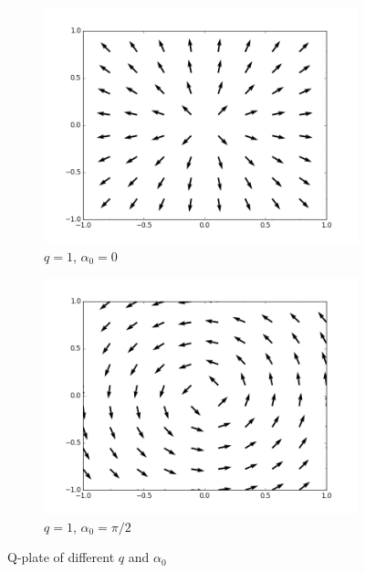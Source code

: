 \documentclass[11pt,a4paper]{article}
\numberwithin{equation}{section}
\begin{document}
\begin{figure}[H]
\begin{subfigure}[H]{0.24\textwidth}
		\includegraphics[width=\textwidth]{qplate(1).png}
		\caption{$q=1$, $\alpha_0=0$}
		\label{fig:q1}
	\end{subfigure}
	\hfil
	\begin{subfigure}[H]{0.24\textwidth}
		\centering
		\includegraphics[width=\textwidth]{qplate(1,r).png}
		\caption{$q=1$, $\alpha_0=\pi/2$}
		\label{fig:q1r}
	\end{subfigure}
	\caption{Q-plate of different $q$ and $\alpha_0$}
	\label{fig:qplate}
\end{figure}


\end{document}
